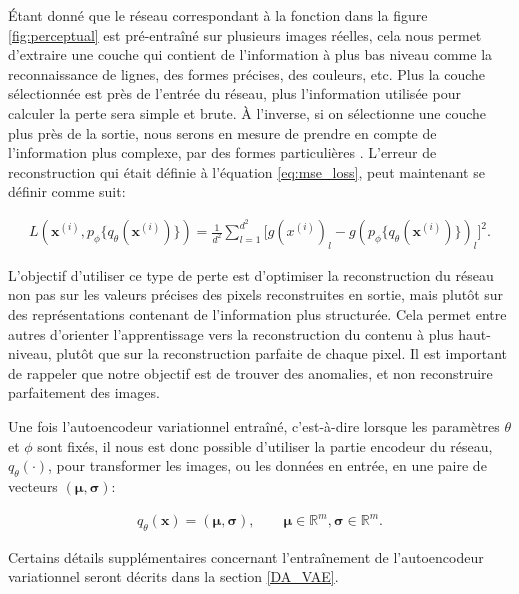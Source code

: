 Étant donné que le réseau correspondant à la fonction \DIFdelbegin {}\DIFdelend \DIFaddbegin {}\DIFaddend dans la figure \ref{fig:perceptual} est pré-entraîné sur plusieurs images réelles, cela nous permet d'extraire une couche qui contient de l'information à plus bas niveau comme la reconnaissance de lignes, des formes précises, des couleurs, etc. Plus la couche sélectionnée est près de l'entrée du réseau, plus l'information utilisée pour calculer la perte sera simple et brute. À l'inverse, si on sélectionne une couche plus près de la sortie, nous serons en mesure de prendre en compte de l'information plus complexe, par \DIFdelbegin {}\DIFdelend \DIFaddbegin {}\DIFaddend des formes particulières \citep{Johnson2016Perceptual}. L'erreur de reconstruction qui était définie à l'équation \ref{eq:mse_loss}, peut maintenant se définir comme suit:

\begin{gather} \label{eq:perceptual_loss}
L(\boldsymbol{x}^{(i)}, p_\phi\{q_\theta(\boldsymbol{x}^{(i)})\}) = \frac{1}{d^2} \sum_{l=1}^{d^2} \Big[g(x^{(i)})_{l} - g(p_\phi\{q_\theta(\boldsymbol{x}^{(i)})\})_{l}\Big]^2.
\end{gather}

L'objectif d'utiliser ce type de perte est d'optimiser la reconstruction du réseau non pas sur les valeurs précises des pixels reconstruites en sortie, mais plutôt sur des représentations contenant de l'information plus structurée. Cela permet entre autres d'orienter l'apprentissage vers la reconstruction du contenu à plus haut-niveau, plutôt que sur la reconstruction parfaite de chaque pixel. Il est important de rappeler que notre objectif est de trouver des anomalies, et non reconstruire parfaitement des images.

Une fois l'autoencodeur variationnel entraîné, c'est-à-dire lorsque les paramètres $\theta$ et $\phi$ sont fixés, il nous est donc possible d'utiliser la partie encodeur du réseau, $q_{\theta}(\cdot) $, pour transformer les images, ou les données en entrée, en une paire de vecteurs $(\boldsymbol{\mu}, \boldsymbol{\sigma})$:

\begin{gather}  \label{eq:encodeur}
q_{\theta}(\boldsymbol{x}) = (\boldsymbol{\mu}, \boldsymbol{\sigma}), \qquad \boldsymbol{\mu} \in \mathbb{R}^m, \boldsymbol{\sigma} \in \mathbb{R}^m.
\end{gather}

Certains détails supplémentaires concernant l'entraînement de l'autoencodeur variationnel seront décrits dans la section \ref{DA_VAE}.


